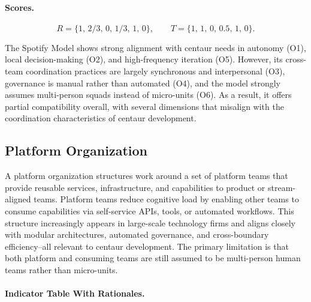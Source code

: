 \documentclass[11pt, a4paper, twocolumn]{article} %
\begin{document}
\paragraph{Scores.}

\[
R = \{1,\, 2/3,\, 0,\, 1/3,\, 1,\, 0\},
\qquad
T = \{1,\, 1,\, 0,\, 0.5,\, 1,\, 0\}.
\]

The Spotify Model shows strong alignment with centaur needs in autonomy (O1),
local decision-making (O2), and high-frequency iteration (O5). However, its
cross-team coordination practices are largely synchronous and interpersonal
(O3), governance is manual rather than automated (O4), and the model strongly
assumes multi-person squads instead of micro-units (O6). As a result, it offers
partial compatibility overall, with several dimensions that misalign with the
coordination characteristics of centaur development.

\newpage
\subsection*{Platform Organization}

A platform organization structures work around a set of platform teams that
provide reusable services, infrastructure, and capabilities to product or
stream-aligned teams. Platform teams reduce cognitive load by enabling other
teams to consume capabilities via self-service APIs, tools, or automated
workflows. This structure increasingly appears in large-scale technology firms
and aligns closely with modular architectures, automated governance, and
cross-boundary efficiency--all relevant to centaur development. The primary
limitation is that both platform and consuming teams are still assumed to be
multi-person human teams rather than micro-units.

\paragraph{Indicator Table With Rationales.}
\end{document}
